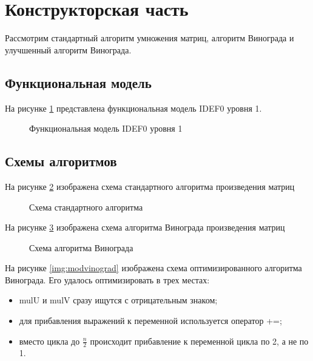 \newpage
\section{Конструкторская часть}

Рассмотрим стандартный алгоритм умножения матриц, алгоритм Винограда и улучшенный
алгоритм Винограда.

\subsection{Функциональная модель}

На рисунке \ref{img:idef0} представлена функциональная модель IDEF0 уровня 1.

\begin{figure}[H]
    \caption{Функциональная модель IDEF0 уровня 1}
    \label{img:idef0}
\end{figure}

\subsection{Схемы алгоритмов}

На рисунке \ref{img:default} изображена схема стандартного алгоритма произведения
матриц

\begin{figure}[H]
    \caption{Схема стандартного алгоритма}
    \label{img:default}
\end{figure}

На рисунке \ref{img:vinograd} изображена схема алгоритма
Винограда произведения матриц

\begin{figure}[H]
    \caption{Схема алгоритма Винограда}
    \label{img:vinograd}
\end{figure}

На рисунке \ref{img:modvinograd} изображена схема
оптимизированного алгоритма Винограда. Его удалось оптимизировать в трех местах:

\begin{itemize}
    \item {\ttfamily mulU} и {\ttfamily mulV} сразу ищутся с отрицательным знаком;
    \item для прибавления выражений к переменной используется оператор {\ttfamily +=};
    \item вместо цикла до $\frac{n}{2}$ происходит прибавление к переменной цикла
        по 2, а не по 1.
\end{itemize}


